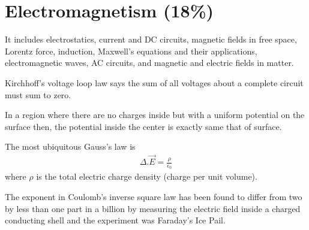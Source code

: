 
\section{Electromagnetism (18\%)}

It includes electrostatics, current and DC circuits, magnetic fields in free space, Lorentz force, induction, Maxwell's equations and their applications, electromagnetic waves, AC circuits, and magnetic and electric fields in matter.


Kirchhoff's voltage loop law says the sum of all voltages about a complete circuit must sum to zero.

In a region where there are no charges inside but with a uniform potential on the surface then, the potential inside the center is exactly same that of surface.

The most ubiquitous Gauss's law is
\begin{align*}
\Delta . \vec{E} = \frac{\rho}{\epsilon_{0}} 
\end{align*}
 where $\rho$ is the total electric charge density (charge per unit volume).
 
The exponent in Coulomb's inverse square law has been found to differ from two by less than one part in a billion by measuring the electric field inside a charged conducting shell and the experiment was Faraday's Ice Pail.